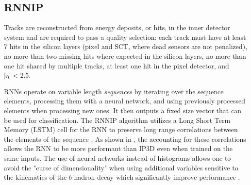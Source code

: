 \subsection{RNNIP}

\def\figpath{figures/ftag/dips-note/}

Tracks are reconstructed from energy deposits, or hits, in the inner detector system and are required to pass a quality selection: 
each track must have at least 7 hits in the silicon layers (pixel and SCT, where dead sensors are not penalized), 
no more than two missing hits where expected in the silicon layers, 
no more than one hit shared by multiple tracks, 
at least one hit in the pixel detector, and $|\eta| < 2.5$. 




RNNs operate on variable length \emph{sequences} by iterating over the sequence elements, processing them with a neural network, and using previously processed elements when processing new ones. 
It then outputs a fixed size vector that can be used for classification. 
The RNNIP algorithm utilizes a Long Short Term Memory (LSTM) cell for the RNN to preserve long range correlations between the elements of the sequence \cite{LSTMs}. 
As shown in \cite{ATL-PHYS-PUB-2017-003}, the accounting for these correlations allows the RNN to be more performant than IP3D even when trained on the same inputs.
The use of neural networks instead of histograms allows one to avoid the "curse of dimensionality" when using additional variables sensitive to the kinematics of the $b$-hadron decay which significantly improve performance \cite{ATL-PHYS-PUB-2017-003}.


